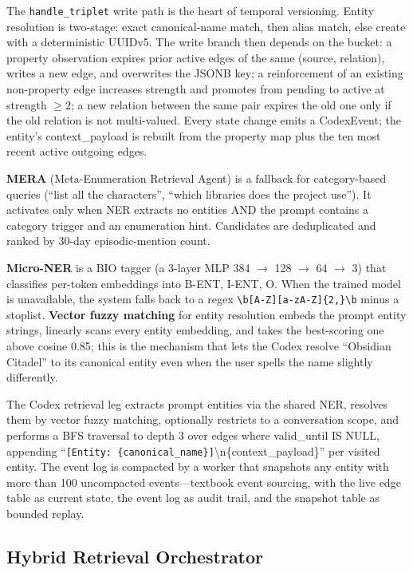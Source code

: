 \documentclass[10pt]{article}
\begin{document}
The \texttt{handle\_triplet} write path is the heart of temporal versioning. Entity resolution is two-stage: exact canonical-name match, then alias match, else create with a deterministic UUIDv5. The write branch then depends on the bucket: a property observation expires prior active edges of the same (source, relation), writes a new edge, and overwrites the JSONB key; a reinforcement of an existing non-property edge increases strength and promotes from pending to active at strength $\geq 2$; a new relation between the same pair expires the old one only if the old relation is not multi-valued. Every state change emits a CodexEvent; the entity's context\_payload is rebuilt from the property map plus the ten most recent active outgoing edges.

\textbf{MERA} (Meta-Enumeration Retrieval Agent) is a fallback for category-based queries (``list all the characters'', ``which libraries does the project use''). It activates only when NER extracts no entities AND the prompt contains a category trigger and an enumeration hint. Candidates are deduplicated and ranked by 30-day episodic-mention count.

\textbf{Micro-NER} is a BIO tagger (a 3-layer MLP 384 $\rightarrow$ 128 $\rightarrow$ 64 $\rightarrow$ 3) that classifies per-token embeddings into B-ENT, I-ENT, O. When the trained model is unavailable, the system falls back to a regex \texttt{\textbackslash b[A-Z][a-zA-Z]\{2,\}\textbackslash b} minus a stoplist. \textbf{Vector fuzzy matching} for entity resolution embeds the prompt entity strings, linearly scans every entity embedding, and takes the best-scoring one above cosine 0.85; this is the mechanism that lets the Codex resolve ``Obsidian Citadel'' to its canonical entity even when the user spells the name slightly differently.

The Codex retrieval leg extracts prompt entities via the shared NER, resolves them by vector fuzzy matching, optionally restricts to a conversation scope, and performs a BFS traversal to depth 3 over edges where valid\_until IS NULL, appending ``\texttt{[Entity: \{canonical\_name\}]}\textbackslash n\{context\_payload\}'' per visited entity. The event log is compacted by a worker that snapshots any entity with more than 100 uncompacted events---textbook event sourcing, with the live edge table as current state, the event log as audit trail, and the snapshot table as bounded replay.

\subsection{Hybrid Retrieval Orchestrator}
\end{document}
